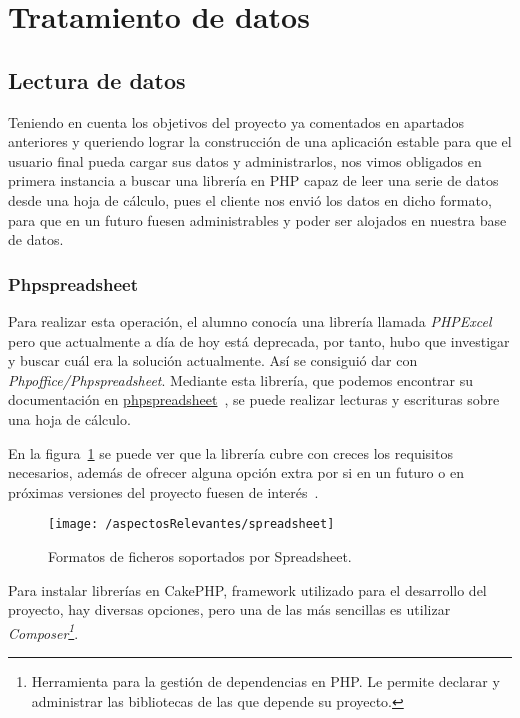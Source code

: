 
\section{Tratamiento de datos}

\subsection{Lectura de datos}

Teniendo en cuenta los objetivos del proyecto ya comentados en apartados anteriores y queriendo lograr la construcción de una aplicación estable para que el usuario final pueda cargar sus datos y administrarlos, nos vimos obligados en primera instancia a buscar una librería en PHP capaz de leer una serie de datos desde una hoja de cálculo, pues el cliente nos envió los datos en dicho formato, para que en un futuro fuesen administrables y poder ser alojados en nuestra base de datos.

\subsubsection{Phpspreadsheet}

Para realizar esta operación, el alumno conocía una librería llamada \textit{PHPExcel} pero que actualmente a día de hoy está deprecada, por tanto, hubo que investigar y buscar cuál era la solución actualmente. Así se consiguió dar con \textit{Phpoffice/Phpspreadsheet}. Mediante esta librería, que podemos encontrar su documentación en \href{https://phpspreadsheet.readthedocs.io/en/develop/}{phpspreadsheet}~\cite{web:spreadsheet}, se puede realizar lecturas y escrituras sobre una hoja de cálculo. 

En la figura~\ref{fig:spreadsheet} se puede ver que la librería cubre con creces los requisitos necesarios, además de ofrecer alguna opción extra por si en un futuro o en próximas versiones del proyecto fuesen de interés~\cite{web:spreadsheet}.

\begin{figure}[ht]
	\centering
	\texttt{[image: /aspectosRelevantes/spreadsheet]}
	\caption{Formatos de ficheros soportados por Spreadsheet.}
	\label{fig:spreadsheet}
\end{figure}

Para instalar librerías en CakePHP, framework utilizado para el desarrollo del proyecto, hay diversas opciones, pero una de las más sencillas es utilizar \textit{Composer\footnote{Herramienta para la gestión de dependencias en PHP. Le permite declarar y administrar las bibliotecas de las que depende su proyecto.}}.

